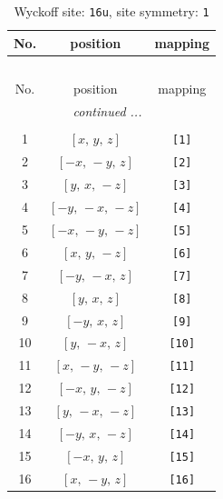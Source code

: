 \documentclass[fleqn,8pt]{jsarticle}
\begin{document}
\begin{longtable}{ccc}
\caption{Wyckoff site: {\tt 16u}, site symmetry: {\tt 1}}
 \\
 \hline \hline
No. & position & mapping \\ \hline \endfirsthead

\multicolumn{2}{l}{\tablename\ \thetable{}} \\
 \hline \hline
No. & position & mapping \\ \hline \endhead

 \hline \hline
\multicolumn{2}{r}{\footnotesize\it continued ...} \\ \endfoot

 \hline \hline
\multicolumn{2}{r}{} \\ \endlastfoot

1 & $\left[ x,\, y,\, z \right]$ & {\tt [1]} \\ \hline
2 & $\left[ - x,\, - y,\, z \right]$ & {\tt [2]} \\ \hline
3 & $\left[ y,\, x,\, - z \right]$ & {\tt [3]} \\ \hline
4 & $\left[ - y,\, - x,\, - z \right]$ & {\tt [4]} \\ \hline
5 & $\left[ - x,\, - y,\, - z \right]$ & {\tt [5]} \\ \hline
6 & $\left[ x,\, y,\, - z \right]$ & {\tt [6]} \\ \hline
7 & $\left[ - y,\, - x,\, z \right]$ & {\tt [7]} \\ \hline
8 & $\left[ y,\, x,\, z \right]$ & {\tt [8]} \\ \hline
9 & $\left[ - y,\, x,\, z \right]$ & {\tt [9]} \\ \hline
10 & $\left[ y,\, - x,\, z \right]$ & {\tt [10]} \\ \hline
11 & $\left[ x,\, - y,\, - z \right]$ & {\tt [11]} \\ \hline
12 & $\left[ - x,\, y,\, - z \right]$ & {\tt [12]} \\ \hline
13 & $\left[ y,\, - x,\, - z \right]$ & {\tt [13]} \\ \hline
14 & $\left[ - y,\, x,\, - z \right]$ & {\tt [14]} \\ \hline
15 & $\left[ - x,\, y,\, z \right]$ & {\tt [15]} \\ \hline
16 & $\left[ x,\, - y,\, z \right]$ & {\tt [16]} \\
\end{longtable}
\end{document}
